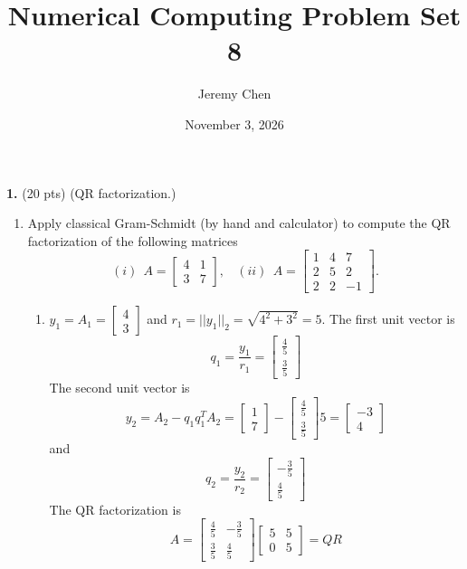 \documentclass[10pt,letterpaper]{article}
\title{Numerical Computing Problem Set 8}
\author{Jeremy Chen}
\date{November 3, 2026}
\begin{document}
	\maketitle

\noindent\textbf{1.} (20 pts) (QR factorization.)

\begin{enumerate}[label=\textbf{(\alph{enumi})}, wide=0pt]

\item Apply classical Gram-Schmidt (by hand and calculator) to compute the QR factorization of the following matrices
$$(i)\ \ A = \begin{bmatrix}
4 & 1 \\
3 & 7 
\end{bmatrix},\ \ \ \ (ii)\ \ A = \begin{bmatrix}
1 & 4 & 7 \\
2 & 5 & 2 \\
2 & 2 & -1 
\end{bmatrix}.$$

\color{TangGreen}
\begin{enumerate}[label=(\roman{enumii})]

\item $y_{1} = A_{1} = \begin{bmatrix}
4 \\
3 
\end{bmatrix}$ and $r_{1} = ||y_{1}||_{2} = \sqrt{4^{2} + 3^{2}} = 5$. The first unit vector is
$$q_{1} = \frac{y_{1}}{r_{1}} = \begin{bmatrix}
\frac{4}{5} \\
\frac{3}{5} 
\end{bmatrix}$$
The second unit vector is
$$y_{2} = A_{2} - q_{1}q_{1}^{T}A_{2} = \begin{bmatrix}
1 \\
7 
\end{bmatrix} - \begin{bmatrix}
\frac{4}{5} \\
\frac{3}{5} 
\end{bmatrix}5 = \begin{bmatrix}
-3 \\
4
\end{bmatrix}$$
and
$$q_{2} = \frac{y_{2}}{r_{2}} = \begin{bmatrix}
-\frac{3}{5} \\
\frac{4}{5} 
\end{bmatrix}$$
The QR factorization is
$$A = \begin{bmatrix}
\frac{4}{5} & -\frac{3}{5} \\
\frac{3}{5} & \frac{4}{5} 
\end{bmatrix}\begin{bmatrix}
5 & 5 \\
0 & 5 
\end{bmatrix} = QR$$


\end{enumerate}
\end{enumerate}
\end{document}
